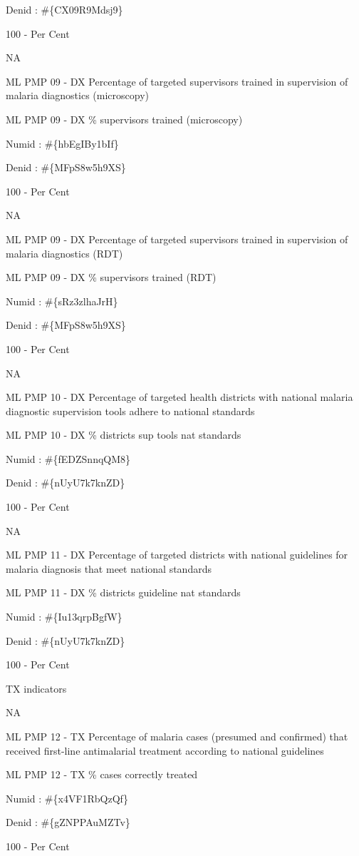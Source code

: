 \documentclass[]{book}
\begin{document}
Denid : \#\{CX09R9Mdsj9\}

100 - Per Cent

NA

ML PMP 09 - DX Percentage of targeted supervisors trained in supervision of malaria diagnostics (microscopy)

ML PMP 09 - DX \% supervisors trained (microscopy)

Numid : \#\{hbEgIBy1bIf\}

Denid : \#\{MFpS8w5h9XS\}

100 - Per Cent

NA

ML PMP 09 - DX Percentage of targeted supervisors trained in supervision of malaria diagnostics (RDT)

ML PMP 09 - DX \% supervisors trained (RDT)

Numid : \#\{sRz3zlhaJrH\}

Denid : \#\{MFpS8w5h9XS\}

100 - Per Cent

NA

ML PMP 10 - DX Percentage of targeted health districts with national malaria diagnostic supervision tools adhere to national standards

ML PMP 10 - DX \% districts sup tools nat standards

Numid : \#\{fEDZSnnqQM8\}

Denid : \#\{nUyU7k7knZD\}

100 - Per Cent

NA

ML PMP 11 - DX Percentage of targeted districts with national guidelines for malaria diagnosis that meet national standards

ML PMP 11 - DX \% districts guideline nat standards

Numid : \#\{Iu13qrpBgfW\}

Denid : \#\{nUyU7k7knZD\}

100 - Per Cent

TX indicators

NA

ML PMP 12 - TX Percentage of malaria cases (presumed and confirmed) that received first-line antimalarial treatment according to national guidelines

ML PMP 12 - TX \% cases correctly treated

Numid : \#\{x4VF1RbQzQf\}

Denid : \#\{gZNPPAuMZTv\}

100 - Per Cent
\end{document}
